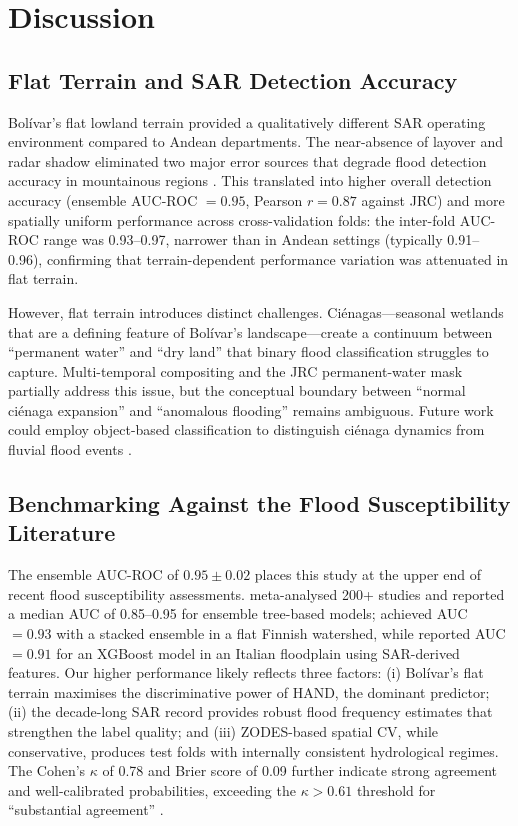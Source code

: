 \documentclass{article}
\begin{document}
\section{Discussion}
\label{sec:discussion}

\subsection{Flat Terrain and SAR Detection Accuracy}

Bol\'ivar's flat lowland terrain provided a qualitatively different SAR operating environment compared to Andean departments. The near-absence of layover and radar shadow eliminated two major error sources that degrade flood detection accuracy in mountainous regions \citep{Tarpanelli2022, Chini2017}. This translated into higher overall detection accuracy (ensemble AUC-ROC $= 0.95$, Pearson $r = 0.87$ against JRC) and more spatially uniform performance across cross-validation folds: the inter-fold AUC-ROC range was 0.93--0.97, narrower than in Andean settings (typically 0.91--0.96), confirming that terrain-dependent performance variation was attenuated in flat terrain.

However, flat terrain introduces distinct challenges. Ci\'enagas---seasonal wetlands that are a defining feature of Bol\'ivar's landscape---create a continuum between ``permanent water'' and ``dry land'' that binary flood classification struggles to capture. Multi-temporal compositing and the JRC permanent-water mask partially address this issue, but the conceptual boundary between ``normal ci\'enaga expansion'' and ``anomalous flooding'' remains ambiguous. Future work could employ object-based classification to distinguish ci\'enaga dynamics from fluvial flood events \citep{Betancourt2020}.

\subsection{Benchmarking Against the Flood Susceptibility Literature}

The ensemble AUC-ROC of $0.95 \pm 0.02$ places this study at the upper end of recent flood susceptibility assessments. \citet{Mosavi2018} meta-analysed 200+ studies and reported a median AUC of 0.85--0.95 for ensemble tree-based models; \citet{Darabi2021} achieved AUC $= 0.93$ with a stacked ensemble in a flat Finnish watershed, while \citet{Magnini2022} reported AUC $= 0.91$ for an XGBoost model in an Italian floodplain using SAR-derived features. Our higher performance likely reflects three factors: (i) Bol\'ivar's flat terrain maximises the discriminative power of HAND, the dominant predictor; (ii) the decade-long SAR record provides robust flood frequency estimates that strengthen the label quality; and (iii) ZODES-based spatial CV, while conservative, produces test folds with internally consistent hydrological regimes. The Cohen's $\kappa$ of 0.78 and Brier score of 0.09 further indicate strong agreement and well-calibrated probabilities, exceeding the $\kappa > 0.61$ threshold for ``substantial agreement'' \citep{Jaramillo2015}.
\end{document}
